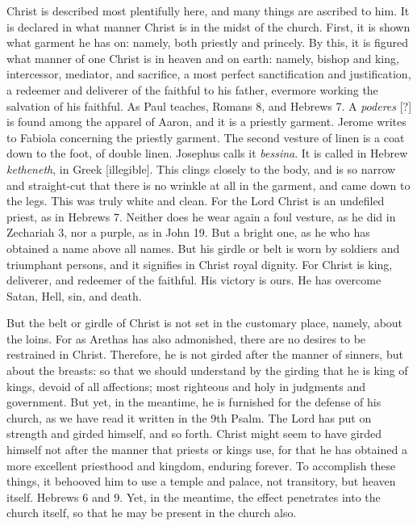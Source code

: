 Christ is described most plentifully here, and many things are ascribed to him. It is declared in what manner Christ is in the midst of the church. First, it is shown what garment he has on: namely, both priestly and princely. By this, it is figured what manner of one Christ is in heaven and on earth: namely, bishop and king, intercessor, mediator, and sacrifice, a most perfect sanctification and justification, a redeemer and deliverer of the faithful to his father, evermore working the salvation of his faithful. As Paul teaches, Romans 8, and Hebrews 7. A \textit{poderes} [?] is found among the apparel of Aaron, and it is a priestly garment. Jerome writes to Fabiola concerning the priestly garment. The second vesture of linen is a coat down to the foot, of double linen. Josephus calls it \textit{bessina}. It is called in Hebrew \textit{ketheneth}, in Greek [illegible]. This clings closely to the body, and is so narrow and straight-cut that there is no wrinkle at all in the garment, and came down to the legs. This was truly white and clean. For the Lord Christ is an undefiled priest, as in Hebrews 7. Neither does he wear again a foul vesture, as he did in Zechariah 3, nor a purple, as in John 19. But a bright one, as he who has obtained a name above all names. But his girdle or belt is worn by soldiers and triumphant persons, and it signifies in Christ royal dignity. For Christ is king, deliverer, and redeemer of the faithful. His victory is ours. He has overcome Satan, Hell, sin, and death.

But the belt or girdle of Christ is not set in the customary place, namely, about the loins. For as Arethas has also admonished, there are no desires to be restrained in Christ. Therefore, he is not girded after the manner of sinners, but about the breasts: so that we should understand by the girding that he is king of kings, devoid of all affections; most righteous and holy in judgments and government. But yet, in the meantime, he is furnished for the defense of his church, as we have read it written in the 9th Psalm. The Lord has put on strength and girded himself, and so forth. Christ might seem to have girded himself not after the manner that priests or kings use, for that he has obtained a more excellent priesthood and kingdom, enduring forever. To accomplish these things, it behooved him to use a temple and palace, not transitory, but heaven itself. Hebrews 6 and 9. Yet, in the meantime, the effect penetrates into the church itself, so that he may be present in the church also.

